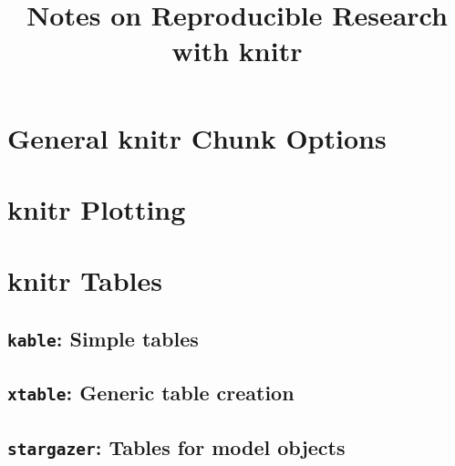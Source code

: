 \documentclass[a4]{article}
\title{Notes on Reproducible Research with knitr}
\date{}
\begin{document}
\section*{General knitr Chunk Options}

\section*{knitr Plotting}

\section*{knitr Tables}

\subsection*{\texttt{kable}: Simple tables}

\subsection*{\texttt{xtable}: Generic table creation}

\subsection*{\texttt{stargazer}: Tables for model objects}
\end{document}
